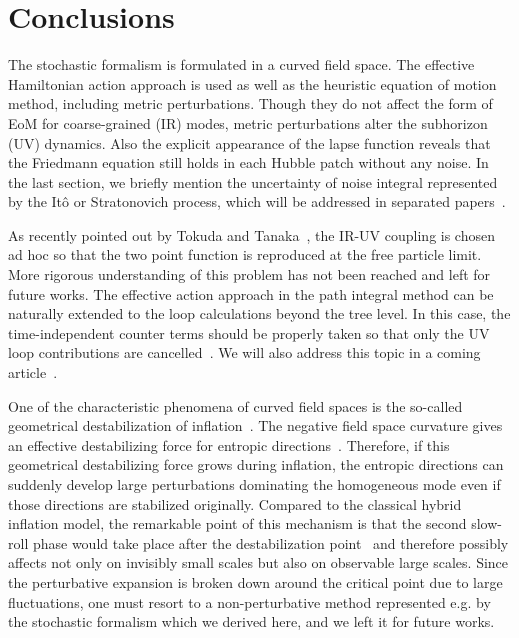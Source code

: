 \documentclass[a4paper,11pt]{article}
\begin{document}
\section{Conclusions}\label{sec: conclusions}

The stochastic formalism is formulated in a curved field space. The effective Hamiltonian action approach is used as well as the heuristic
equation of motion method, including metric perturbations.
Though they do not affect the form of EoM for coarse-grained (IR) modes, metric perturbations alter the subhorizon (UV) dynamics.
Also the explicit appearance of the lapse function reveals that the Friedmann equation still holds in each Hubble patch without any noise.
In the last section, we briefly mention the uncertainty of noise integral represented by the It\^o or Stratonovich process, which will be addressed
in separated papers~\cite{1st,3rd,4th}.

As recently pointed out by Tokuda and Tanaka~\cite{Tokuda:2017fdh}, the IR-UV coupling is chosen ad hoc so that the two point function is reproduced 
at the free particle limit. More rigorous understanding of this problem has not been reached and left for future works.
The effective action approach in the path integral method can be naturally extended to the loop calculations beyond the tree level.
In this case, the time-independent counter terms should be properly taken so that only the UV loop contributions are cancelled~\cite{Tokuda:2017fdh}.
We will also address this topic in a coming article~\cite{4th}.

One of the characteristic phenomena of curved field spaces is the so-called geometrical destabilization of inflation~\cite{Renaux-Petel:2015mga,
Renaux-Petel:2017dia,Garcia-Saenz:2018ifx}. The negative field space curvature gives an effective destabilizing force for entropic directions~\cite{Renaux-Petel:2015mga}.
Therefore, if this geometrical destabilizing force grows during inflation, the entropic directions can suddenly develop large perturbations dominating 
the homogeneous mode even if those directions are stabilized originally. Compared to the classical hybrid inflation model, the remarkable point of this mechanism
is that the second slow-roll phase would take place after the destabilization point~\cite{Garcia-Saenz:2018ifx} and therefore possibly affects not only on
invisibly small scales but also on observable large scales.
Since the perturbative expansion is broken down around the critical point due to large fluctuations, one must resort to a non-perturbative method represented e.g. by
the stochastic formalism which we derived here, and we left it for future works.
\end{document}
